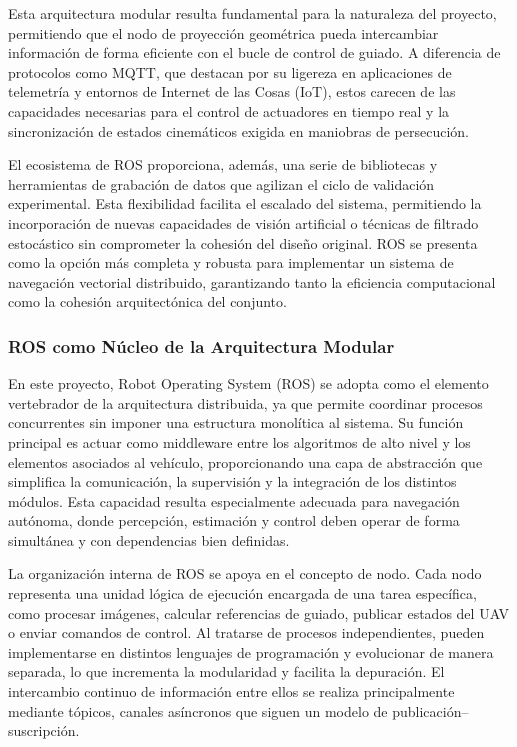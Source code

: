 \vspace{0.4cm}

Esta arquitectura modular resulta fundamental para la naturaleza del proyecto, permitiendo que el nodo de proyección geométrica pueda intercambiar información de forma eficiente con el bucle de control de guiado. A diferencia de protocolos como MQTT, que destacan por su ligereza en aplicaciones de telemetría y entornos de Internet de las Cosas (IoT), estos carecen de las capacidades necesarias para el control de actuadores en tiempo real y la sincronización de estados cinemáticos exigida en maniobras de persecución.

\vspace{0.4cm}

El ecosistema de ROS proporciona, además, una serie de bibliotecas y herramientas de grabación de datos que agilizan el ciclo de validación experimental. Esta flexibilidad facilita el escalado del sistema, permitiendo la incorporación de nuevas capacidades de visión artificial o técnicas de filtrado estocástico sin comprometer la cohesión del diseño original. ROS se presenta como la opción más completa y robusta para
implementar un sistema de navegación vectorial distribuido, garantizando tanto la
eficiencia computacional como la cohesión arquitectónica del conjunto.


\subsubsection{ROS como Núcleo de la Arquitectura Modular}

En este proyecto, Robot Operating System (ROS) se adopta como el elemento vertebrador de la arquitectura distribuida, ya que permite coordinar procesos concurrentes sin imponer una estructura monolítica al sistema. Su función principal es actuar como middleware entre los algoritmos de alto nivel y los elementos asociados al vehículo, proporcionando una capa de abstracción que simplifica la comunicación, la supervisión y la integración de los distintos módulos. Esta capacidad resulta especialmente adecuada para navegación autónoma, donde percepción, estimación y control deben operar de forma simultánea y con dependencias bien definidas.

\vspace{0.3cm}

La organización interna de ROS se apoya en el concepto de nodo. Cada nodo representa una unidad lógica de ejecución encargada de una tarea específica, como procesar imágenes, calcular referencias de guiado, publicar estados del UAV o enviar comandos de control. Al tratarse de procesos independientes, pueden implementarse en distintos lenguajes de programación y evolucionar de manera separada, lo que incrementa la modularidad y facilita la depuración. El intercambio continuo de información entre ellos se realiza principalmente mediante tópicos, canales asíncronos que siguen un modelo de publicación--suscripción.

